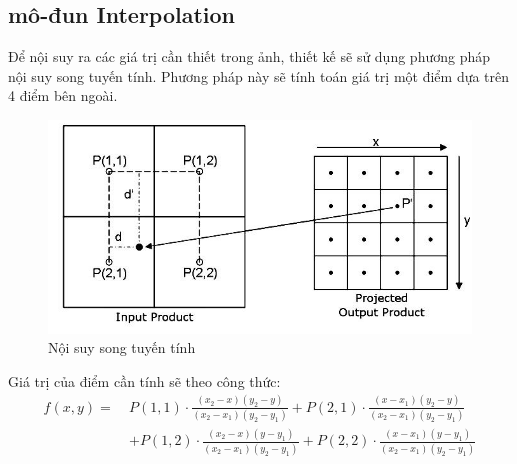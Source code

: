 \subsection{mô-đun Interpolation}
Để nội suy ra các giá trị cần thiết trong ảnh, thiết kế sẽ sử dụng phương pháp nội suy song tuyến tính. Phương pháp này sẽ tính toán giá trị một điểm dựa trên 4 điểm bên ngoài. 
\begin{figure}[!ht]
	\centering
	\includegraphics[width=1\linewidth]{figures/BilinearInterpolation_fig001.png.jpg}
	\caption{Nội suy song tuyến tính}
	\label{fig:BilinearInterpolationV2}
\end{figure}


Giá trị của điểm cần tính sẽ theo công thức:
\begin{equation}
	\begin{aligned}
		f(x, y) =\ &P(1,1) \cdot \frac{(x_2 - x)(y_2 - y)}{(x_2 - x_1)(y_2 - y_1)} + P(2,1) \cdot \frac{(x - x_1)(y_2 - y)}{(x_2 - x_1)(y_2 - y_1)} \\
		&+ P(1,2) \cdot \frac{(x_2 - x)(y - y_1)}{(x_2 - x_1)(y_2 - y_1)} + P(2,2) \cdot \frac{(x - x_1)(y - y_1)}{(x_2 - x_1)(y_2 - y_1)}
	\end{aligned}
\end{equation}

